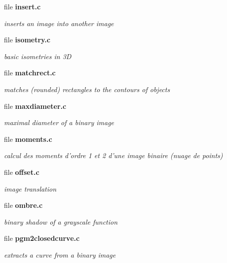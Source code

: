 \begin{CompactItemize}
\item 
file {\bf insert.c}
\begin{CompactList}\small\item\em inserts an image into another image \item\end{CompactList}

\item 
file {\bf isometry.c}
\begin{CompactList}\small\item\em basic isometries in 3D \item\end{CompactList}

\item 
file {\bf matchrect.c}
\begin{CompactList}\small\item\em matches (rounded) rectangles to the contours of objects \item\end{CompactList}

\item 
file {\bf maxdiameter.c}
\begin{CompactList}\small\item\em maximal diameter of a binary image \item\end{CompactList}

\item 
file {\bf moments.c}
\begin{CompactList}\small\item\em calcul des moments d'ordre 1 et 2 d'une image binaire (nuage de points) \item\end{CompactList}

\item 
file {\bf offset.c}
\begin{CompactList}\small\item\em image translation \item\end{CompactList}

\item 
file {\bf ombre.c}
\begin{CompactList}\small\item\em binary shadow of a grayscale function \item\end{CompactList}

\item 
file {\bf pgm2closedcurve.c}
\begin{CompactList}\small\item\em extracts a curve from a binary image \item\end{CompactList}


\end{CompactItemize}
